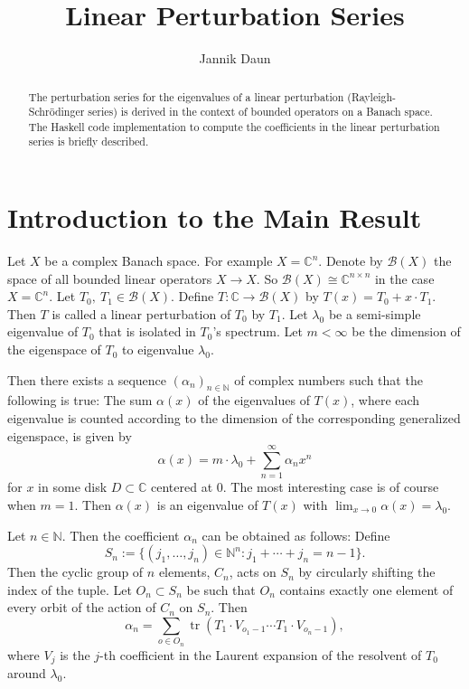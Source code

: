 \documentclass[11pt, a4paper]{article} %
\title{Linear Perturbation Series}
\author{Jannik Daun}
\numberwithin{equation}{subsection} %
\theoremstyle{definition} %
\theoremstyle{plain} %
\DeclareMathOperator{\tr}{tr}
\begin{document}
\maketitle
\begin{abstract}
	The perturbation series for the eigenvalues of a linear perturbation
	(Rayleigh-Schrödinger series) is derived in the context of bounded operators on a Banach space.
	The Haskell code implementation to compute the coefficients in the linear perturbation series is briefly described.
\end{abstract}


\section{Introduction to the Main Result}
Let $X$ be a complex Banach space.
For example $X= \mathbb{C}^n$.
Denote by $\mathscr{B}(X)$ the space of all bounded linear operators $X \to X$.
So $\mathscr{B} (X) \cong \mathbb{C}^{n \times n}$ in the case $X= \mathbb{C}^n$.
Let $T_0 , \ T_1 \in \mathscr{B}(X)$.
Define $T : \mathbb{C} \to \mathscr{B}(X)$ by $T (x) = T_0 + x \cdot T_1$.
Then $T$ is called a linear perturbation of $T_0$ by $T_1$.
Let $\lambda_0$ be a semi-simple eigenvalue of $T_0$ that is isolated in $T_0$'s spectrum.
Let $m< \infty$ be the dimension of the eigenspace of $T_0$ to eigenvalue $\lambda_0$.

Then there exists a sequence $(\alpha_n)_{n \in \mathbb{N}}$ of complex numbers such that the following is true:
The sum $\alpha (x)$
of the eigenvalues of $T(x)$, where each eigenvalue is counted according to the dimension of the corresponding
generalized eigenspace, is given by
\begin{equation}
	\boxed{\alpha (x) = m \cdot \lambda_0 + \sum_{n=1}^\infty \alpha_n x^n}
\end{equation}
for $x$ in some disk $D \subset \mathbb{C}$ centered at $0$. The most interesting case is of course when $m=1$. Then $\alpha(x)$ is an eigenvalue of $T(x)$ with $\lim_{x \to 0}\alpha(x) =\lambda_0$.

Let $n \in \mathbb{N}$.
Then the coefficient $\alpha_n$ can be obtained as follows:
Define
\begin{equation}
	S_n := \{ (j_1, \dots, j_n ) \in \mathbb{N}^n : j_1 + \cdots + j_n = n-1 \}.
\end{equation}
Then the cyclic group of $n$ elements, $C_n$, acts on $S_n$ by circularly shifting the index of the tuple.
Let $O_n \subset S_n$ be such that $O_n$ contains exactly one element of every orbit of the action of $C_n$ on $S_n$.
Then
\begin{equation}
	\boxed{
		\alpha_n = \sum_{o \in O_n }
		\tr ( T_{1} \cdot  V_{o_1-1} \cdots T_{1} \cdot V_{o_n-1}),}
\end{equation}
where $V_{j}$ is the $j$-th coefficient in the Laurent expansion of the resolvent of $T_0$
around $\lambda_0$.
\end{document}
